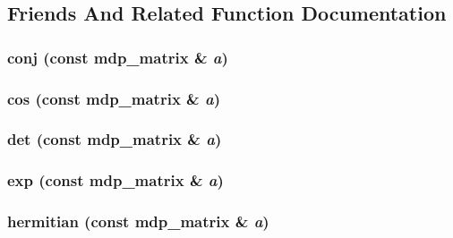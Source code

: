 \subsection{Friends And Related Function Documentation}
\hypertarget{classmdp__matrix_ae0dd178eaad795af699d595ca0ef5c37}{
\subsubsection[{conj}]{ conj (const {\bf mdp\_\-matrix} \& {\em a})}}
\label{classmdp__matrix_ae0dd178eaad795af699d595ca0ef5c37}
\hypertarget{classmdp__matrix_aba32e6f9246f9ebad76f6b5c4e696cea}{
\subsubsection[{cos}]{ cos (const {\bf mdp\_\-matrix} \& {\em a})}}
\label{classmdp__matrix_aba32e6f9246f9ebad76f6b5c4e696cea}
\hypertarget{classmdp__matrix_aed4c7d1f4639e8a8e7e435a617d59080}{
\subsubsection[{det}]{ det (const {\bf mdp\_\-matrix} \& {\em a})}}
\label{classmdp__matrix_aed4c7d1f4639e8a8e7e435a617d59080}
\hypertarget{classmdp__matrix_af3a316cad42444877d4ab7e2a72c37c7}{
\subsubsection[{exp}]{ exp (const {\bf mdp\_\-matrix} \& {\em a})}}
\label{classmdp__matrix_af3a316cad42444877d4ab7e2a72c37c7}
\hypertarget{classmdp__matrix_a351ca320380dbd121764fa96d4f0f711}{
\subsubsection[{hermitian}]{ hermitian (const {\bf mdp\_\-matrix} \& {\em a})}}
